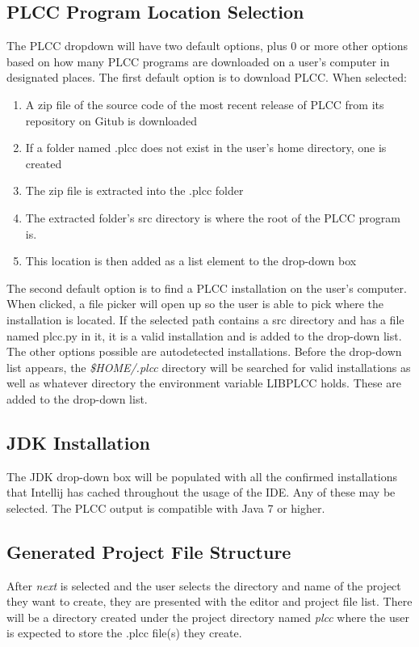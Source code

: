 \documentclass[conference, letterpaper]{IEEEtran}
\begin{document}
\subsection{PLCC Program Location Selection}\label{subsec:plcc-program-location}
The PLCC dropdown will have two default options, plus 0 or more other options based on how many PLCC programs are downloaded on a user's computer in designated places.
The first default option is to download PLCC\@.
When selected:
\begin{enumerate}
    \item A zip file of the source code of the most recent release of PLCC from its repository on Gitub is downloaded
    \item If a folder named .plcc does not exist in the user's home directory, one is created
    \item The zip file is extracted into the .plcc folder
    \item The extracted folder's src directory is where the root of the PLCC program is.
    \item This location is then added as a list element to the drop-down box
\end{enumerate}
The second default option is to find a PLCC installation on the user's computer.
When clicked, a file picker will open up so the user is able to pick where the installation is located.
If the selected path contains a src directory and has a file named plcc.py in it, it is a valid installation and is added to the drop-down list.
The other options possible are autodetected installations.
Before the drop-down list appears, the \textit{\$HOME/.plcc} directory will be searched for valid installations as well as whatever directory the environment variable LIBPLCC holds.
These are added to the drop-down list.

\subsection{JDK Installation}\label{subsec:jdk-installation}
The JDK drop-down box will be populated with all the confirmed installations that Intellij has cached throughout the usage of the IDE. Any of these may be selected.
The PLCC output is compatible with Java 7 or higher.

\subsection{Generated Project File Structure}\label{subsec:generated-project-file-structure}
After \textit{next} is selected and the user selects the directory and name of the project they want to create, they are presented with the editor and project file list.
There will be a directory created under the project directory named \textit{plcc} where the user is expected to store the .plcc file(s) they create.
\end{document}
